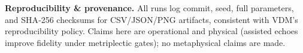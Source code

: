 \documentclass{article}
\begin{document}
\bigskip
\noindent\textbf{Reproducibility \& provenance.} All runs log commit, seed, full parameters, and SHA‑256 checksums for CSV/JSON/PNG artifacts, consistent with VDM’s reproducibility policy. Claims here are operational and physical (assisted echoes improve fidelity under metriplectic gates); no metaphysical claims are made.
\end{document}
